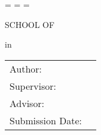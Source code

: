 \begin{titlepage}
  \oddsidemargin=\evensidemargin\relax
  \textwidth=\dimexpr{}\evensidemargin-2in\relax
  \hsize=\textwidth\relax

  \centering


  \vspace{5mm}
  {\huge\MakeUppercase{School of \getSchool{}} \par}

  \vspace{5mm}
  {\large\MakeUppercase{\getUniversity{}} \par}

  \vspace{30mm}
  {\huge\bfseries \getTitle{} \par}
  
  \vspace{10mm}
  {\Large \foreignlanguage{ngerman}{\getTitleGer{}} \par}
  
  \vspace{40mm}
  {\large \getDoctype{} in \getDegree{} \par}


  \vspace{15mm}
  \begin{tabular}{l l}
    Author:          & \getAuthor{}         \\
    Supervisor:      & \getSupervisor{}     \\
    Advisor:         & \getAdvisor{}        \\
    Submission Date: & \getSubmissionDate{} \\
  \end{tabular}

\end{titlepage}
